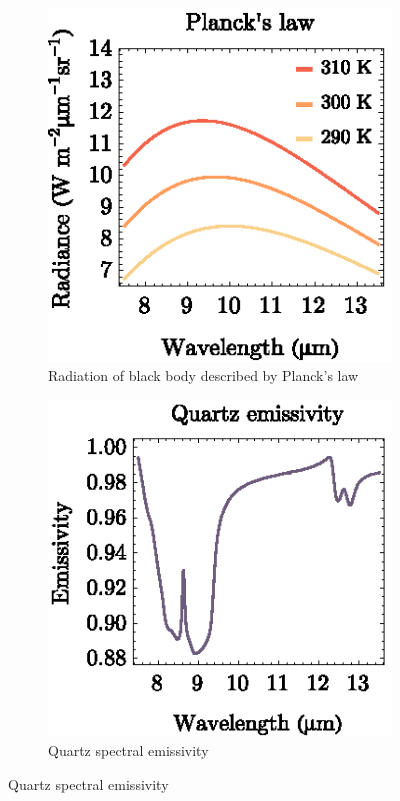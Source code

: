 \begin{figure}[htb]
	\centering
	\vspace{1em}
	\begin{subfigure}[t]{.3\linewidth}
		\centering
		\includegraphics[scale=1]{pics/Chapter_01/PlancksLaw.eps}
		\vspace{-0.1cm}
		\caption{Radiation of black body described by Planck's law}
		\label{fig:BBradiation}
	\end{subfigure}
	\hspace{1em}
	\begin{subfigure}[t]{.3\linewidth}
		\centering
		\includegraphics[scale=1]{pics/Chapter_01/QuartzSpectrum.eps}
		\vspace{-0.1cm}
		\caption{Quartz spectral emissivity}
		\label{fig:QuartzEmissivity}

\end{subfigure}
\end{figure}
